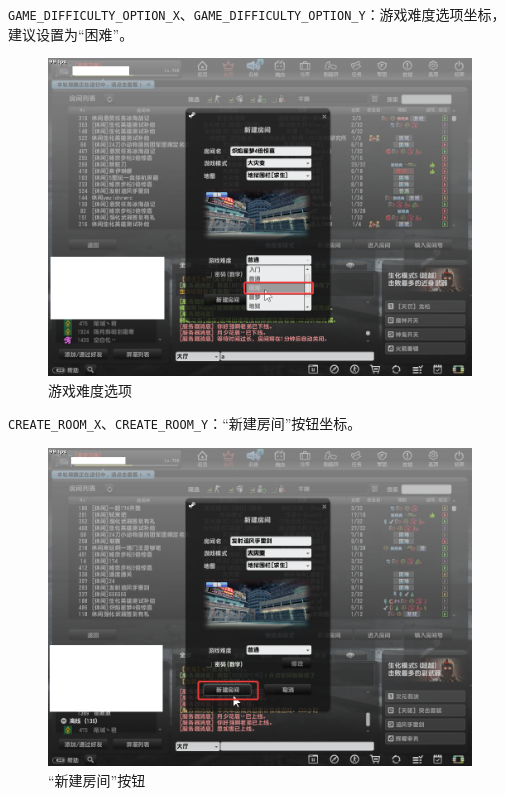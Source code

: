 \lstinline{GAME_DIFFICULTY_OPTION_X}、\lstinline{GAME_DIFFICULTY_OPTION_Y}：游戏难度选项坐标，建议设置为“困难”。

\begin{figure}[H]
    \Centering
    \includegraphics[width=\textwidth]{docs/assets/difficulty_option.png}
    \caption{游戏难度选项}
\end{figure}

\lstinline{CREATE_ROOM_X}、\lstinline{CREATE_ROOM_Y}：“新建房间”按钮坐标。

\begin{figure}[H]
    \Centering
    \includegraphics[width=\textwidth]{docs/assets/create_room_1.png}
    \caption{“新建房间”按钮}
\end{figure}

